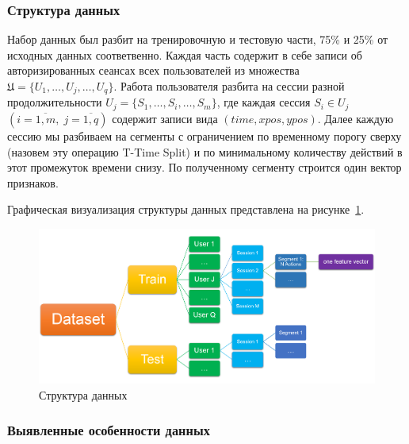 \documentclass[12pt]{article}
\begin{document}
    \subsubsection{Структура данных}
    \label{sec:Research:Data:Struct}
    
    \par Набор данных был разбит на тренировочную и тестовую части, 75\% и 25\% от исходных данных соответвенно. Каждая часть содержит в себе записи об авторизированных сеансах всех пользователей из множества $\mathfrak{U}=\{U_1, \ldots, U_j, \ldots, U_q\}$. Работа пользователя разбита на сессии разной продолжительности $U_j = \{S_1, \ldots, S_i, \ldots, S_m\}$, где каждая сессия $S_i \in U_j$ $(i = \overline{1,m}, \; j = \overline{1,q})$ содержит записи вида $(time, xpos, ypos)$. Далее каждую сессию мы разбиваем на сегменты с ограничением по временному порогу сверху (назовем эту операцию T-Time Split) и по минимальному количеству действий в этот промежуток времени снизу. По полученному сегменту строится один вектор признаков.

    \par Графическая визуализация структуры данных представлена на рисунке~\ref{sec:Research:Data:Description:fig:DataStructure}.

    \vspace{10mm}
    \begin{figure}[h!]
        \centering
        \includegraphics[width=\linewidth]{DataStructure.png}
        \caption{Структура данных}
        \label{sec:Research:Data:Description:fig:DataStructure}
    \end{figure}
    \vspace{5mm}


    \subsubsection{Выявленные особенности данных}
    \label{sec:Research:Data:Features}
\end{document}
